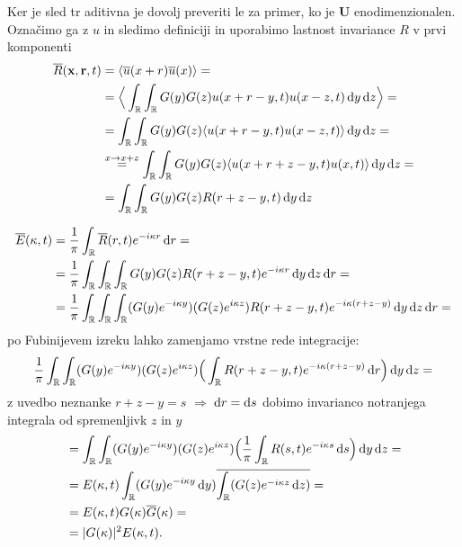 \documentclass[mat2, tisk]{fmfdelo}
\newcommand{\R}{\mathbb R}
\newcommand{\bd}{\textbf}
\begin{document}
\begin{dokaz}
Ker je sled tr aditivna je dovolj preveriti le za primer, ko je 
$\bd{U}$ enodimenzionalen. Označimo ga z $u$ in sledimo definiciji 
in uporabimo lastnost invariance $R$ v prvi komponenti
\begin{align*}
\overline{R}(\bd{x}, \bd{r}, t) &= \langle \overline{u}(x + r) \overline{u}(x) \rangle = \\
&= \Big\langle\int_\R \int_\R G(y) G(z) u(x+r-y, t) u(x-z, t) \dif y \dif z\Big\rangle = \\
&= \int_\R \int_\R G(y) G(z) \langle u(x+r-y, t) u(x-z, t) \rangle \dif y \dif z = \\
&\stackrel{x \rightarrow x + z}{=} \int_\R \int_\R G(y) G(z) \langle u(x+r+z-y, t) u(x, t) \rangle \dif y \dif z = \\
&= \int_\R \int_\R G(y) G(z) R(r+z-y, t) \dif y \dif z
\end{align*}

\begin{align*}
\overline{E}(\kappa, t) &= \frac{1}{\pi} \int_\R \overline{R}(r, t) e^{-i\kappa r} \dif r = \\
&= \frac{1}{\pi}\int_{\R} \int_{\R} \int_\R G(y) G(z) R(r+z-y,t) e^{-i\kappa r} \dif y \dif z \dif r = \\
&= \frac{1}{\pi}\int_{\R} \int_{\R} \int_\R (G(y) e^{-i\kappa y}) (G(z) e^{i\kappa z}) R(r+z-y,t) e^{-i\kappa(r+z-y)} \dif y \dif z \dif r = 
\end{align*}
po Fubinijevem izreku lahko zamenjamo vrstne rede integracije: 
\begin{align*}
\frac{1}{\pi}\int_{\R} \int_\R (G(y) e^{-i\kappa y}) (G(z) e^{i\kappa z}) \Big(\int_{\R} R(r+z-y,t) e^{-i\kappa(r+z-y)} \dif r \Big) \dif y \dif z =
\end{align*}
z uvedbo neznanke $r + z - y = s$ $\Longrightarrow$ $\dif r = \dif s$ dobimo invarianco notranjega integrala od
spremenljivk $z$ in $y$
\begin{align*}
&= \int_{\R} \int_\R (G(y) e^{-i\kappa y}) (G(z) e^{i\kappa z}) \Big(\frac{1}{\pi}\int_{\R} R(s,t) e^{-i\kappa s} \dif s \Big) \dif y \dif z = \\
&= E(\kappa, t) \int_\R (G(y) e^{-i\kappa y}\dif y) \overline{\int_{\R} (G(z) e^{-i\kappa z} \dif z)}  = \\
&= E(\kappa, t) G(\kappa) \overline{G}(\kappa) = \\
&= |G(\kappa)|^2 E(\kappa, t).
\end{align*}
\end{dokaz}
\end{document}
